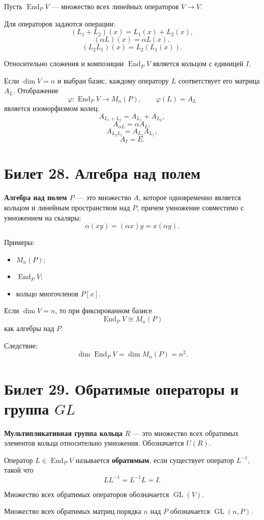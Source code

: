 \documentclass[12pt,a4paper]{article}
\DeclareMathOperator{\End}{End}
\DeclareMathOperator{\GL}{GL}
\begin{document}
Пусть $\End_P V$ --- множество всех линейных операторов $V\to V$.

Для операторов задаются операции:
\[
    (L_1+L_2)(x)=L_1(x)+L_2(x),
\]
\[
    (\alpha L)(x)=\alpha L(x),
\]
\[
    (L_2L_1)(x)=L_2(L_1(x)).
\]

Относительно сложения и композиции $\End_P V$ является кольцом с единицей $I$.

Если $\dim V=n$ и выбран базис, каждому оператору $L$ соответствует его матрица $A_L$. Отображение
\[
    \varphi:\End_P V\to M_n(P),\qquad \varphi(L)=A_L
\]
является изоморфизмом колец:
\[
    A_{L_1+L_2}=A_{L_1}+A_{L_2},
\]
\[
    A_{\alpha L}=\alpha A_L,
\]
\[
    A_{L_2L_1}=A_{L_2}A_{L_1},
\]
\[
    A_I=E.
\]

\section{Билет 28. Алгебра над полем}

\textbf{Алгебра над полем $P$} --- это множество $A$, которое одновременно является кольцом и линейным пространством над $P$, причем умножение совместимо с умножением на скаляры:
\[
    \alpha(xy)=(\alpha x)y=x(\alpha y).
\]

Примеры:
\begin{itemize}
    \item $M_n(P)$;
    \item $\End_P V$;
    \item кольцо многочленов $P[x]$.
\end{itemize}

Если $\dim V=n$, то при фиксированном базисе
\[
    \End_P V\cong M_n(P)
\]
как алгебры над $P$.

Следствие:
\[
    \dim \End_P V=\dim M_n(P)=n^2.
\]

\section{Билет 29. Обратимые операторы и группа $GL$}

\textbf{Мультипликативная группа кольца} $R$ --- это множество всех обратимых элементов кольца относительно умножения. Обозначается $U(R)$.

Оператор $L\in\End_P V$ называется \textbf{обратимым}, если существует оператор $L^{-1}$, такой что
\[
    LL^{-1}=L^{-1}L=I.
\]

Множество всех обратимых операторов обозначается $\GL(V)$.

Множество всех обратимых матриц порядка $n$ над $P$ обозначается $\GL(n,P)$.
\end{document}
